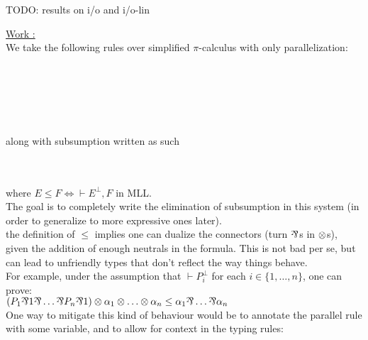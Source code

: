 \documentclass[a4paper,12pt]{book}
\begin{document}
\newpage

TODO: results on i/o and i/o-lin

\bigskip

\underline{Work :}\\
We take the following rules over simplified $\pi$-calculus with only parallelization:\\~\\~\\
\indent\hfill\begin{prooftree}\end{prooftree}\hfill
\begin{prooftree}\end{prooftree}\hfill
\begin{prooftree}\end{prooftree}\hfill~\\~\\~\\
along with subsumption written as such
\begin{prooftree}\end{prooftree}\\~\\
where $E \leq F \iff \vdash E^\bot,F$ in MLL.\\
The goal is to completely write the elimination of subsumption in this system (in order to generalize to more expressive ones later).\\
\remark the definition of $\leq$ implies one can dualize the connectors (\ie turn $\logpar$s in $\logtensor$s), given the addition of enough neutrals in the formula. This is not bad per se, but can lead to unfriendly types that don't reflect the way things behave.\\
For example, under the assumption that $\vdash P_i^\bot$ for each $i\in\{1,\ldots,n\}$, one can prove:\\
$(P_1 \logpar 1 \logpar \ldots \logpar P_n \logpar 1) \logtensor \alpha_1 \logtensor \ldots \logtensor \alpha_n \leq \alpha_1 \logpar \ldots \logpar \alpha_n$\\
One way to mitigate this kind of behaviour would be to annotate the parallel rule with some variable, and to allow for context in the typing rules:\\~\\~\\
\indent\hfill\begin{prooftree}\end{prooftree}\hfill
\end{document}
